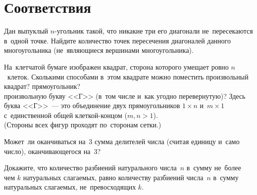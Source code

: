 

\section*{Соответствия}


\begin{problems}

\item
Дан выпуклый $n$-угольник такой, что никакие три его диагонали не~пересекаются
в~одной точке.
Найдите количество точек пересечения диагоналей данного многоугольника
(не~являющиеся вершинами многоугольника).

\item
На~клетчатой бумаге изображен квадрат, сторона которого умещает ровно
$n$~клеток.
Сколькими способами в~этом квадрате можно поместить произвольный
\\
\subproblem квадрат?
\qquad
\subproblem прямоугольник?
\\
\subproblem
произвольную букву <<Г>> (в~том числе и~как угодно перевернутую)?
Здесь буква <<Г>>~--- это объединение двух прямоугольников $1 \times n$
и~$m \times 1$ с~единственной общей клеткой-концом ($m, n > 1$).
\\
(Стороны всех фигур проходят по~сторонам сетки.)

\item
Может~ли оканчиваться на~$3$ сумма делителей числа (считая единицу и~само
число), оканчивающегося на~$3$?

\item
Докажите, что количество разбиений натурального числа~$n$ в~сумму не~более чем
$k$ натуральных слагаемых, равно количеству разбиений числа~$n$ в~сумму
натуральных слагаемых, не~превосходящих $k$.



\end{problems}
